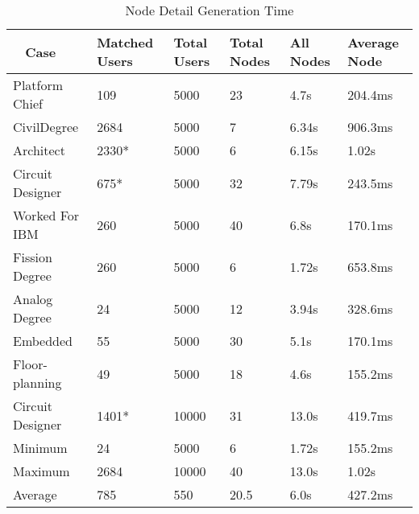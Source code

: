 \begin{table}[H]
  \centering
  \begin{tabular}{|p{17mm}|p{16mm}|p{10mm}|p{18mm}|p{19mm}|p{20mm}|}
  \hline
  \
  Case&Matched Users&Total Users&Total Nodes&All Nodes&Average Node\\
  \hline\hline
  Platform Chief&109&5000&23&4.7s&204.4ms\\ \hline
  Civil\newline Degree&2684&5000&7&6.34s&906.3ms\\ \hline 
  Architect&2330*&5000&6&6.15s&1.02s\\ \hline
  Circuit Designer&675*&5000&32&7.79s&243.5ms\\ \hline
  Worked For IBM&260&5000&40&6.8s&170.1ms\\ \hline
  Fission Degree&260&5000&6&1.72s&653.8ms\\ \hline
  Analog Degree&24&5000&12&3.94s&328.6ms\\ \hline
  Embedded&55&5000&30&5.1s&170.1ms\\ \hline
  Floor- \newline planning&49&5000&18&4.6s&155.2ms\\ \hline
  Circuit Designer&1401*&10000&31&13.0s&419.7ms\\ \hline
  \hline\hline
  Minimum&24&5000&6&1.72s&155.2ms\\ \hline
  Maximum&2684&10000&40&13.0s&1.02s\\ \hline
  Average&785&550&20.5&6.0s&427.2ms\\ \hline
  \end{tabular}
  \label{tab:node-perf}
  \caption{Node Detail Generation Time}
\end{table}